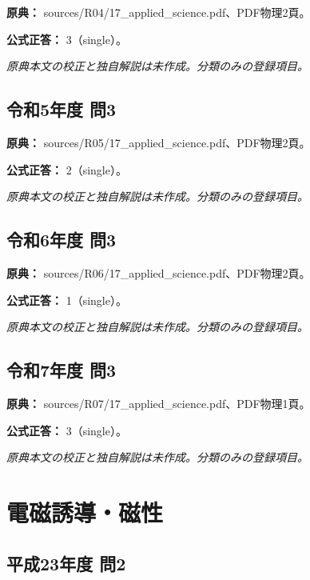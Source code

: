 \noindent\textbf{原典：} sources/R04/17\_applied\_science.pdf、PDF物理2頁。

\textbf{公式正答：} 3（single）。

\par\textit{原典本文の校正と独自解説は未作成。分類のみの登録項目。}

\subsection{令和5年度 問3}
\label{q:r05-reg-applied-03}

\noindent\textbf{原典：} sources/R05/17\_applied\_science.pdf、PDF物理2頁。

\textbf{公式正答：} 2（single）。

\par\textit{原典本文の校正と独自解説は未作成。分類のみの登録項目。}

\subsection{令和6年度 問3}
\label{q:r06-reg-applied-03}

\noindent\textbf{原典：} sources/R06/17\_applied\_science.pdf、PDF物理2頁。

\textbf{公式正答：} 1（single）。

\par\textit{原典本文の校正と独自解説は未作成。分類のみの登録項目。}

\subsection{令和7年度 問3}
\label{q:r07-reg-applied-03}

\noindent\textbf{原典：} sources/R07/17\_applied\_science.pdf、PDF物理1頁。

\textbf{公式正答：} 3（single）。

\par\textit{原典本文の校正と独自解説は未作成。分類のみの登録項目。}

\section{電磁誘導・磁性}

\subsection{平成23年度 問2}
\label{q:h23-reg-applied-02}

